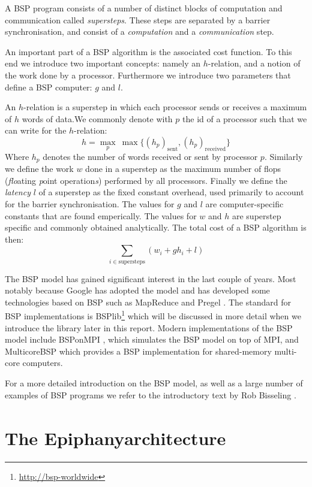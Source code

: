 \documentclass[fleqn]{article}
\renewcommand{\(}{\left(}
\renewcommand{\)}{\right)}
\newcommand{\tm}{\textsuperscript{\texttrademark}}
\begin{document}
A BSP program consists of a number of distinct blocks of computation and communication called \emph{supersteps}. These steps are separated by a barrier synchronisation, and consist of a \emph{computation} and a \emph{communication} step.

An important part of a BSP algorithm is the associated cost function. To this end we introduce two important concepts: namely an $h$-relation, and a notion of the work done by a processor. Furthermore we introduce two parameters that define a BSP computer: $g$ and $l$.

An $h$-relation is a superstep in which each processor sends or receives a maximum of $h$ words of data.We commonly denote with $p$ the id of a processor such that we can write for the $h$-relation:
$$h = \max_{p} ~ \max \{ (h_p)_\text{sent} ,  (h_p)_\text{received} \}$$
Where $h_p$ denotes the number of words received or sent by processor $p$. Similarly we define the work $w$ done in a superstep as the maximum number of flops (\emph{flo}ating \emph{p}oint operation\emph{s})  performed by all processors. Finally we define the \emph{latency} $l$ of a superstep as the fixed constant overhead, used primarily to account for the barrier synchronisation. The values for $g$ and $l$ are computer-specific constants that are found emperically. The values for $w$ and $h$ are superstep specific and commonly obtained analytically. The total cost of a BSP algorithm is then:
$$ \sum_{i \in \text{supersteps}} \( w_i + g h_i + l \)$$

The BSP model has gained significant interest in the last couple of years. Most notably because Google has adopted the model and has developed some technologies based on BSP such as MapReduce \cite{goo:mapreduce} and Pregel \cite{goo:pregel}. The standard for BSP implementations is BSPlib\footnote{\url{http://bsp-worldwide}} which will be discussed in more detail when we introduce the library later in this report. Modern implementations of the BSP model include BSPonMPI \cite{bsponmpi}, which simulates the BSP model on top of MPI, and MulticoreBSP \cite{multicorebsp} which provides a BSP implementation for shared-memory multi-core computers.

For a more detailed introduction on the BSP model, as well as a large number of examples of BSP programs we refer to the introductory text by Rob Bisseling \cite{bsp:bisseling}.

\section{The Epiphany\tm architecture}
\end{document}
